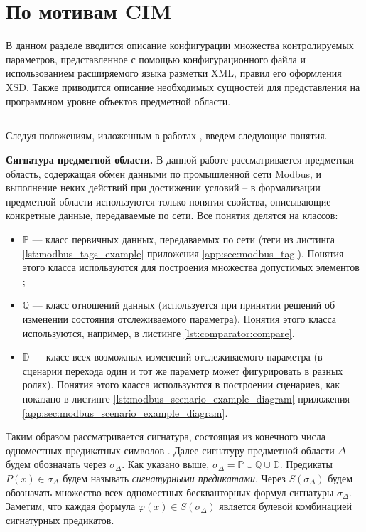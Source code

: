 \chapter{По мотивам CIM}
В данном разделе вводится описание конфигурации множества контролируемых параметров,
представленное с помощью конфигурационного файла и использованием расширяемого языка разметки XML, правил его оформления XSD.
Также приводится описание необходимых сущностей для представления
на программном уровне объектов предметной области.


\section{}\label{sec:ontology}
Следуя положениям, изложенным в работах \cite{journal:vestnic_novosib:palchunov, journal:naukovedenie:serdukov},
введем следующие понятия.

\textbf{Сигнатура предметной области.}
В данной работе рассматривается предметная область, содержащая обмен данными по промышленной сети Modbus,
и выполнение неких действий при достижении условий -- в формализации предметной области используются только понятия-свойства,
описывающие конкретные данные, передаваемые по сети. Все понятия делятся на  классов:
\begin{itemize}
    \item $\mathbb{P}$ --- класс первичных данных, передаваемых по сети (теги из листинга \ref{lst:modbus_tags_example} приложения \ref{app:sec:modbus_tag}).
        Понятия этого класса используются для построения множества допустимых элементов ;
    \item $\mathbb{Q}$ --- класс отношений данных (используется при принятии решений об изменении состояния отслеживаемого параметра).
        Понятия этого класса используются, например, в листинге \ref{lst:comparator:compare}.
    \item $\mathbb{D}$ --- класс всех возможных изменений отслеживаемого параметра (в сценарии перехода один и тот же параметр может фигурировать в разных ролях).
        Понятия этого класса используются в построении сценариев, как показано в листинге \ref{lst:modbus_scenario_example_diagram} приложения \ref{app:sec:modbus_scenario_example_diagram}.
\end{itemize}

Таким образом рассматривается сигнатура, состоящая из конечного числа одноместных предикатных символов \cite[стр. 17]{book:math_logic:guz}.
Далее сигнатуру предметной области $\Delta$ будем обозначать через $\sigma_\Delta$.
Как указано выше, $\sigma_\Delta = \mathbb{P} \cup \mathbb{Q} \cup \mathbb{D}$.
Предикаты $P(x) \in \sigma_\Delta$ будем называть \textit{сигнатурными предикатами}.
Через $S(\sigma_\Delta)$ будем обозначать множество всех одноместных бескванторных формул сигнатуры $\sigma_\Delta$.
Заметим, что каждая формула $\varphi(x) \in S(\sigma_\Delta)$ является булевой комбинацией сигнатурных предикатов.


